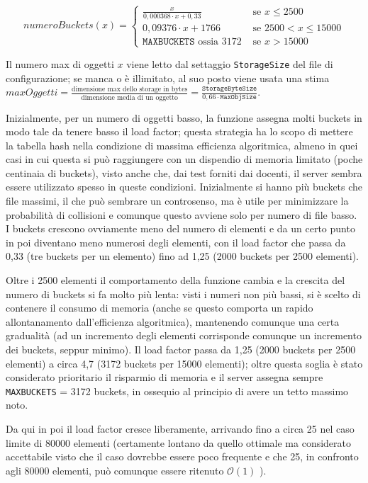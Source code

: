 \documentclass[a4paper,12pt]{article}
\begin{document}
\[
numeroBuckets(x) =
  \begin{cases}
    \frac{x}{0,000368 \cdot x + 0,33}		&	\text{se } x \le 2500 \\
    0,09376 \cdot x + 1766			&\text{se } 2500 < x \le 15000 \\
    \texttt{MAXBUCKETS} \text{ ossia 3172 }	&	\text{se } x > 15000
  \end{cases}
\]

Il numero max di oggetti $x$ viene letto dal settaggio \texttt{StorageSize} del file di configurazione; se manca o è illimitato, al suo posto viene usata una stima $maxOggetti =  \frac{\text{dimensione max dello storage in bytes}}{\text{dimensione media di un oggetto}} = \frac{\texttt{StorageByteSize}}{0,66 \cdot \texttt{MaxObjSize}} $.

Inizialmente, per un numero di oggetti basso, la funzione assegna molti buckets in modo tale da tenere basso il load factor; questa strategia ha lo scopo di mettere la tabella hash nella condizione di massima efficienza algoritmica, almeno in quei casi in cui questa si può raggiungere con un dispendio di memoria limitato (poche centinaia di buckets), visto anche che, dai test forniti dai docenti, il server sembra essere utilizzato spesso in queste condizioni. Inizialmente si hanno più buckets che file massimi, il che può sembrare un controsenso, ma è utile per minimizzare la probabilità di collisioni e comunque questo avviene solo per numero di file basso. I buckets crescono ovviamente meno del numero di elementi e da un certo punto in poi diventano meno numerosi degli elementi, con il load factor che passa da 0,33 (tre buckets per un elemento) fino ad 1,25 (2000 buckets per 2500 elementi).

Oltre i 2500 elementi il comportamento della funzione cambia e la crescita del numero di buckets si fa molto più lenta: visti i numeri non più bassi, si è scelto di contenere il consumo di memoria (anche se questo comporta un rapido allontanamento dall'efficienza algoritmica), mantenendo comunque una certa gradualità (ad un incremento degli elementi corrisponde comunque un incremento dei buckets, seppur minimo). Il load factor passa da 1,25 (2000 buckets per 2500 elementi) a circa 4,7 (3172 buckets per 15000 elementi); oltre questa soglia è stato considerato prioritario il risparmio di memoria e il server assegna sempre \texttt{MAXBUCKETS} = 3172 buckets, in ossequio al principio di avere un tetto massimo noto.

Da qui in poi il load factor cresce liberamente, arrivando fino a circa 25 nel caso limite di 80000 elementi (certamente lontano da quello ottimale ma considerato accettabile visto che il caso dovrebbe essere poco frequente e che 25, in confronto agli 80000 elementi, può comunque essere ritenuto $\mathcal{O}(1)$ ).
\end{document}
